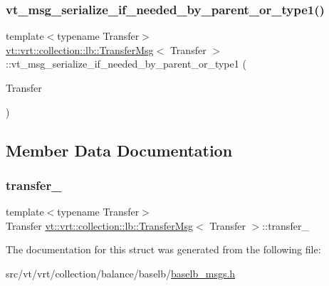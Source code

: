 \subsubsection{\texorpdfstring{vt\+\_\+msg\+\_\+serialize\+\_\+if\+\_\+needed\+\_\+by\+\_\+parent\+\_\+or\+\_\+type1()}{vt\_msg\_serialize\_if\_needed\_by\_parent\_or\_type1()}}
{\footnotesize\ttfamily template$<$typename Transfer$>$ \\
\hyperlink{structvt_1_1vrt_1_1collection_1_1lb_1_1_transfer_msg}{vt\+::vrt\+::collection\+::lb\+::\+Transfer\+Msg}$<$ Transfer $>$\+::vt\+\_\+msg\+\_\+serialize\+\_\+if\+\_\+needed\+\_\+by\+\_\+parent\+\_\+or\+\_\+type1 (\begin{DoxyParamCaption}\item[{Transfer}]{ }\end{DoxyParamCaption})}



\subsection{Member Data Documentation}
\mbox{\label{structvt_1_1vrt_1_1collection_1_1lb_1_1_transfer_msg_ab8a2aefc116dd5d0fc06e6aa722ce0ef}} 
\subsubsection{\texorpdfstring{transfer\+\_\+}{transfer\_}}
{\footnotesize\ttfamily template$<$typename Transfer$>$ \\
Transfer \hyperlink{structvt_1_1vrt_1_1collection_1_1lb_1_1_transfer_msg}{vt\+::vrt\+::collection\+::lb\+::\+Transfer\+Msg}$<$ Transfer $>$\+::transfer\+\_\+\hspace{0.3cm}{\ttfamily [private]}}



The documentation for this struct was generated from the following file\+:\begin{DoxyCompactItemize}
\item 
src/vt/vrt/collection/balance/baselb/\hyperlink{baselb__msgs_8h}{baselb\+\_\+msgs.\+h}\end{DoxyCompactItemize}
